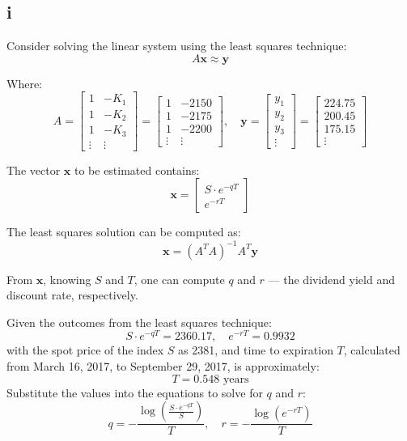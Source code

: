 \documentclass{article}
\begin{document}
\subsection*{i}
Consider solving the linear system using the least squares technique:
\[
    A \mathbf{x} \approx \mathbf{y}
\]

Where:
\[
    A = \begin{bmatrix}
        1      & -K_1   \\
        1      & -K_2   \\
        1      & -K_3   \\
        \vdots & \vdots
    \end{bmatrix} =
    \begin{bmatrix}
        1      & -2150  \\
        1      & -2175  \\
        1      & -2200  \\
        \vdots & \vdots
    \end{bmatrix}, \quad
    \mathbf{y} = \begin{bmatrix}
        y_1 \\
        y_2 \\
        y_3 \\
        \vdots
    \end{bmatrix} =
    \begin{bmatrix}
        224.75 \\
        200.45 \\
        175.15 \\
        \vdots
    \end{bmatrix}
\]


The vector \( \mathbf{x} \) to be estimated contains:
\[
    \mathbf{x} = \begin{bmatrix}
        S \cdot e^{-qT} \\
        e^{-rT}
    \end{bmatrix}
\]

The least squares solution can be computed as:
\[
    \mathbf{x} = (A^T A)^{-1} A^T \mathbf{y}
\]

From \( \mathbf{x} \), knowing \( S \) and \( T \), one can compute \( q \) and \( r \) — the dividend yield and discount rate, respectively.


Given the outcomes from the least squares technique:
\[
    S \cdot e^{-qT} = 2360.17, \quad e^{-rT} = 0.9932
\]
with the spot price of the index \( S \) as 2381, and time to expiration \( T \), calculated from March 16, 2017, to September 29, 2017, is approximately:
\[
    T = 0.548 \text{ years}
\]
Substitute the values into the equations to solve for \( q \) and \( r \):
\[
    q = -\frac{\log\left(\frac{S \cdot e^{-qT}}{S}\right)}{T}, \quad r = -\frac{\log(e^{-rT})}{T}
\]
\end{document}
